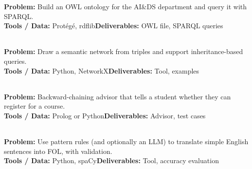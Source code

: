 \documentclass[11pt]{article}
\begin{document}
\begin{tcolorbox}[enhanced,breakable,colback=white,colframe=teal,arc=2mm,boxrule=0.9pt,
  title={\textbf{PIII.06\quad Department Ontology}\hfill \colorbox{white}{\textcolor{teal}{\scriptsize\bfseries MINI}}},fonttitle=\color{white},colbacktitle=teal]
\textbf{\color{navy}Problem:} Build an OWL ontology for the AI\&DS department and query it with SPARQL.\\[2pt]
\textbf{\color{navy}Tools / Data:} Protégé, rdflib\qquad \textbf{\color{navy}Deliverables:} OWL file, SPARQL queries\\[2pt]
\ 
\end{tcolorbox}
\begin{tcolorbox}[enhanced,breakable,colback=white,colframe=teal,arc=2mm,boxrule=0.9pt,
  title={\textbf{PIII.07\quad Semantic Network Visualiser}\hfill \colorbox{white}{\textcolor{teal}{\scriptsize\bfseries MINI}}},fonttitle=\color{white},colbacktitle=teal]
\textbf{\color{navy}Problem:} Draw a semantic network from triples and support inheritance-based queries.\\[2pt]
\textbf{\color{navy}Tools / Data:} Python, NetworkX\qquad \textbf{\color{navy}Deliverables:} Tool, examples\\[2pt]
\ 
\end{tcolorbox}
\begin{tcolorbox}[enhanced,breakable,colback=white,colframe=teal,arc=2mm,boxrule=0.9pt,
  title={\textbf{PIII.08\quad Course Prerequisite Advisor}\hfill \colorbox{white}{\textcolor{teal}{\scriptsize\bfseries MINI}}},fonttitle=\color{white},colbacktitle=teal]
\textbf{\color{navy}Problem:} Backward-chaining advisor that tells a student whether they can register for a course.\\[2pt]
\textbf{\color{navy}Tools / Data:} Prolog or Python\qquad \textbf{\color{navy}Deliverables:} Advisor, test cases\\[2pt]
\ 
\end{tcolorbox}
\begin{tcolorbox}[enhanced,breakable,colback=white,colframe=crimson,arc=2mm,boxrule=0.9pt,
  title={\textbf{PIII.09\quad English-to-FOL Helper}\hfill \colorbox{white}{\textcolor{crimson}{\scriptsize\bfseries MAJOR}}},fonttitle=\color{white},colbacktitle=crimson]
\textbf{\color{navy}Problem:} Use pattern rules (and optionally an LLM) to translate simple English sentences into FOL, with validation.\\[2pt]
\textbf{\color{navy}Tools / Data:} Python, spaCy\qquad \textbf{\color{navy}Deliverables:} Tool, accuracy evaluation\\[2pt]
\ 
\end{tcolorbox}
\end{document}
